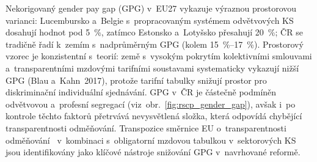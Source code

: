Nekorigovaný gender pay gap (\ac{GPG}) v~EU27 vykazuje výraznou prostorovou varianci: Lucembursko a~Belgie s~propracovaným systémem odvětvových \ac{KS} dosahují hodnot pod \SI{5}{\percent}, zatímco Estonsko a~Lotyšsko přesahují \SI{20}{\percent}; ČR se tradičně řadí k~zemím s~nadprůměrným \ac{GPG} (kolem \SIrange{15}{17}{\percent}).
Prostorový vzorec je konzistentní s~teorií: země s~vysokým pokrytím kolektivními smlouvami a~transparentními mzdovými tarifními soustavami systematicky vykazují nižší \ac{GPG} (Blau a~Kahn~2017), protože tarifní tabulky snižují prostor pro diskriminační individuální sjednávání.
\ac{GPG} v~ČR je částečně podmíněn odvětvovou a~profesní segregací (viz~obr.~\ref{fig:rscp_gender_gap}), avšak i~po kontrole těchto faktorů přetrvává nevysvětlená složka, která odpovídá chybějící transparentnosti odměňování.
Transpozice směrnice \ac{EU} o~transparentnosti odměňování~\cite{smernice_pay_transparency_2023} v~kombinaci s~obligatorní mzdovou tabulkou v~sektorových \ac{KS} jsou identifikovány jako klíčové nástroje snižování \ac{GPG} v~navrhované reformě.



